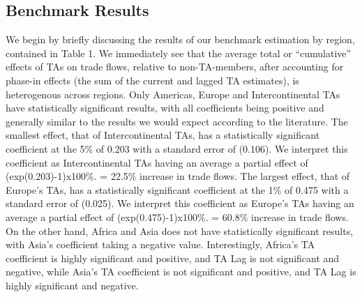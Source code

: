 \documentclass[12pt]{article}%
\begin{document}
\subsection{Benchmark Results}%
\label{subsec:BenchmarkResults}%
We begin by briefly discussing the results of our benchmark estimation
by region, contained in Table 1. We immediately see that the average total or
``cumulative'' effects of TAs on trade flows, relative to non-TA-members, after accounting for
phase-in effects (the sum of the current and lagged TA estimates), is
heterogenous across regions. Only Americas, Europe and Intercontinental
TAs have statistically significant results, with all coefficients being
positive and generally similar to the results we would expect according
to the literature. The smallest effect, that of Intercontinental TAs,
has a statistically significant coefficient at the 5\% of 0.203 with a
standard error of (0.106). We interpret this coefficient as
Intercontinental TAs having an average a partial effect of
(exp(0.203)-1)x100\%. = 22.5\% increase in trade flows. The largest
effect, that of Europe's TAs, has a statistically significant
coefficient at the 1\% of 0.475 with a standard error of (0.025). We
interpret this coefficient as Europe's TAs having an average a partial
effect of (exp(0.475)-1)x100\%. = 60.8\% increase in trade flows. On the
other hand, Africa and Asia does not have statistically significant
results, with Asia's coefficient taking a negative value. Interestingly,
Africa's TA coefficient is highly significant and positive, and TA Lag
is not significant and negative, while Asia's TA coefficient is not
significant and positive, and TA Lag is highly significant and negative.
%
%
\FloatBarrier

%
\end{document}
